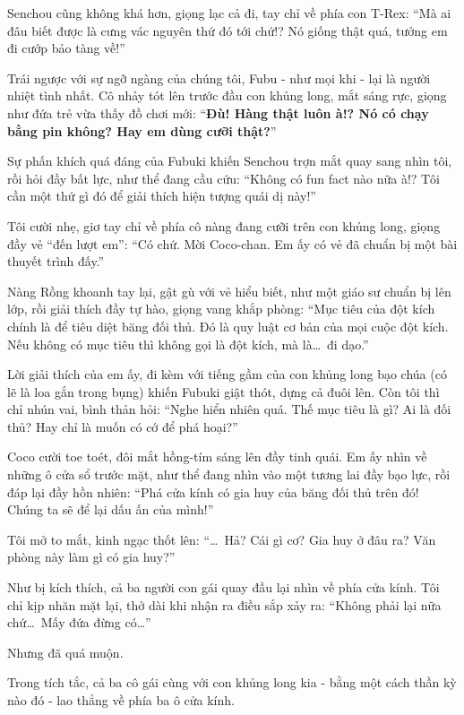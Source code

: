 \documentclass[../main.tex]{subfiles}
\begin{document}
Senchou cũng không khá hơn, giọng lạc cả đi, tay chỉ về phía con T-Rex: ``Mà ai đâu biết được là cưng vác nguyên thứ đó tới chứ!? Nó giống thật quá, tưởng em đi cướp bảo tàng về!''

Trái ngược với sự ngỡ ngàng của chúng tôi, Fubu - như mọi khi - lại là người nhiệt tình nhất. Cô nhảy tót lên trước đầu con khủng long, mắt sáng rực, giọng như đứa trẻ vừa thấy đồ chơi mới: ``\textbf{Đù! Hàng thật luôn à!? Nó có chạy bằng pin không? Hay em dùng cưỡi thật?}''


Sự phấn khích quá đáng của Fubuki khiến Senchou trợn mắt quay sang nhìn tôi, rồi hỏi đầy bất lực, như thể đang cầu cứu: ``Không có fun fact nào nữa à!? Tôi cần một thứ gì đó để giải thích hiện tượng quái dị này!''

Tôi cười nhẹ, giơ tay chỉ về phía cô nàng đang cưỡi trên con khủng long, giọng đầy vẻ ``đến lượt em'': ``Có chứ. Mời Coco-chan. Em ấy có vẻ đã chuẩn bị một bài thuyết trình đấy.''

Nàng Rồng khoanh tay lại, gật gù với vẻ hiểu biết, như một giáo sư chuẩn bị lên lớp, rồi giải thích đầy tự hào, giọng vang khắp phòng: ``Mục tiêu của đột kích chính là để tiêu diệt băng đối thủ. Đó là quy luật cơ bản của mọi cuộc đột kích. Nếu không có mục tiêu thì không gọi là đột kích, mà là\dots\ đi dạo.''

Lời giải thích của em ấy, đi kèm với tiếng gầm của con khủng long bạo chúa (có lẽ là loa gắn trong bụng) khiến Fubuki giật thót, dựng cả đuôi lên. Còn tôi thì chỉ nhún vai, bình thản hỏi: ``Nghe hiển nhiên quá. Thế mục tiêu là gì? Ai là đối thủ? Hay chỉ là muốn có cớ để phá hoại?''

Coco cười toe toét, đôi mắt hồng-tím sáng lên đầy tinh quái. Em ấy nhìn về những ô cửa sổ trước mặt, như thể đang nhìn vào một tương lai đầy bạo lực, rồi đáp lại đầy hồn nhiên: ``Phá cửa kính có gia huy của băng đối thủ trên đó! Chúng ta sẽ để lại dấu ấn của mình!''

Tôi mở to mắt, kinh ngạc thốt lên: ``\dots\ Hả? Cái gì cơ? Gia huy ở đâu ra? Văn phòng này làm gì có gia huy?''

Như bị kích thích, cả ba người con gái quay đầu lại nhìn về phía cửa kính. Tôi chỉ kịp nhăn mặt lại, thở dài khi nhận ra điều sắp xảy ra: ``Không phải lại nữa chứ\dots\ Mấy đứa đừng có\dots''

Nhưng đã quá muộn.

Trong tích tắc, cả ba cô gái cùng với con khủng long kia - bằng một cách thần kỳ nào đó - lao thẳng về phía ba ô cửa kính.
\end{document}
